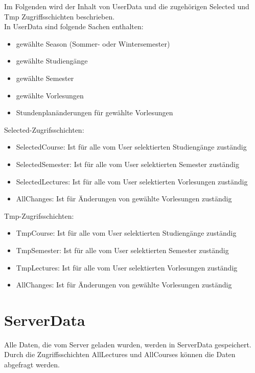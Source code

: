 Im Folgenden wird der Inhalt von UserData und die zugehörigen Selected und Tmp Zugriffsschichten beschrieben.\\

In UserData sind folgende Sachen enthalten:
\begin{itemize}
     \item gewählte Season (Sommer- oder Wintersemester)
     \item gewählte Studiengänge
     \item gewählte Semester
     \item gewählte Vorlesungen
     \item Stundenplanänderungen für gewählte Vorlesungen\\     
\end{itemize}

Selected-Zugrifsschichten: 
\begin{itemize}
     \item SelectedCourse: Ist für alle vom User selektierten Studiengänge zuständig
     \item SelectedSemester: Ist für alle vom User selektierten Semester zuständig
     \item SelectedLectures: Ist für alle vom User selektierten Vorlesungen zuständig
     \item AllChanges: Ist für Änderungen von gewählte Vorlesungen zuständig \\
\end{itemize}

Tmp-Zugrifsschichten: 
\begin{itemize}
     \item TmpCourse: Ist für alle vom User selektierten Studiengänge zuständig
     \item TmpSemester: Ist für alle vom User selektierten Semester zuständig
     \item TmpLectures: Ist für alle vom User selektierten Vorlesungen zuständig
     \item AllChanges: Ist für Änderungen von gewählte Vorlesungen zuständig 
\end{itemize}

\newpage
\section{ServerData}
Alle Daten, die vom Server geladen wurden, werden in ServerData gespeichert. Durch die Zugriffsschichten AllLectures und AllCourses können die Daten abgefragt werden.

